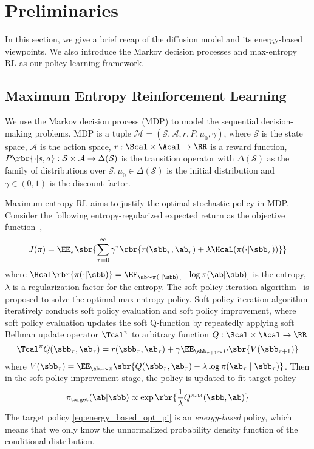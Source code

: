 
\section{Preliminaries}
In this section, we give a brief recap of the diffusion model and its energy-based viewpoints. We also introduce the Markov decision processes and max-entropy RL as our policy learning framework.

\subsection{Maximum Entropy Reinforcement Learning}
\label{sec:max_ent_rl}
We use the Markov decision process (MDP) to model the sequential decision-making problems. 
MDP is a tuple $\mathcal{M}=(\mathcal{S}, \mathcal{A}, r, P, \mu_0, \gamma)$, where $\mathcal{S}$ is the state space, $\mathcal{A}$ is the action space, $r:\Scal\times\Acal\to\RR$ is a reward function,
$P\rbr{\cdot|s, a}: \mathcal{S} \times \mathcal{A} \rightarrow \Delta(\mathcal{S})$ is the transition operator with $\Delta(\mathcal{S})$ as the family of distributions over $\mathcal{S}, \mu_0 \in \Delta(\mathcal{S})$ is the initial distribution and $\gamma \in(0,1)$ is the discount factor. 

Maximum entropy RL aims to justify the optimal stochastic policy in MDP. Consider the following entropy-regularized expected return as the objective function~\cite{haarnoja2017reinforcement},
\begin{equation}
    J(\pi) = \EE_{\pi}\sbr{\sum_{\tau=0}^\infty\gamma^\tau \rbr{r(\sbb_\tau, \ab_\tau) + \lambda\Hcal(\pi(\cdot | \sbb_\tau))}}\label{eq:obj_max_ent_rl}
\end{equation}
where $\Hcal\rbr{\pi(\cdot| \sbb)} = \EE_{\ab\sim\pi(\cdot | \sbb)}[-\log\pi(\ab | \sbb)]$ is the entropy, $\lambda$ is a regularization factor for the entropy. The soft policy iteration algorithm~\cite{haarnoja2017reinforcement,haarnoja2018soft} is proposed to solve the optimal max-entropy policy. Soft policy iteration algorithm iteratively conducts soft policy evaluation and soft policy improvement, where soft policy evaluation updates the soft Q-function by repeatedly applying soft Bellman update operator $\Tcal^\pi$ to arbitrary function $Q:\Scal\times\Acal\to \RR$
\begin{equation}
    \Tcal^\pi Q(\sbb_\tau, \ab_\tau) = r(\sbb_\tau, \ab_\tau) + \gamma\EE_{\sbb_{\tau+1}\sim P}\sbr{V(\sbb_{\tau+1})}\label{eq:soft_pev}
\end{equation}
where $V(\sbb_\tau) = \EE_{\ab_\tau\sim\pi}\sbr{Q(\sbb_\tau, \ab_\tau) - \lambda \log\pi(\ab_\tau\mid \sbb_\tau)}$. Then in the soft policy improvement stage, the policy is updated to fit target policy
\begin{equation}
    \pi_{\rm target}(\ab| \sbb) 
    \propto \exp\rbr{\frac{1}{\lambda}{Q^{\pi_{\rm old}}(\sbb, \ab)}} \label{eq:energy_based_opt_pi}
\end{equation}
The target policy \eqref{eq:energy_based_opt_pi} is an \emph{energy-based} policy, which means that we only know the unnormalized probability density function of the conditional distribution.

